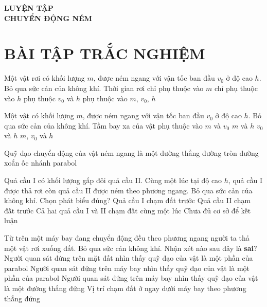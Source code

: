 \begin{center}\textbf{\color{red}LUYỆN TẬP}\\
	\textbf{CHUYỂN ĐỘNG NÉM}
\end{center}
\section{BÀI TẬP TRẮC NGHIỆM}
\begin{ex}
Một vật rơi có khối lượng $m$, được ném ngang với vận tốc ban đầu $v_0$ ở độ cao $h$. Bỏ qua sức cản của không khí. Thời gian rơi	
	\choice
	{chỉ phụ thuộc vào $m$}
	{\True chỉ phụ thuộc vào $h$}
	{phụ thuộc $v_0$ và $h$}
	{phụ thuộc vào $m$, $v_0$, $h$}
	\loigiai{}
\end{ex}
\begin{ex}
	Một vật có khối lượng $m$, được ném ngang với vận tốc ban đầu $v_0$ ở độ cao $h$. Bỏ qua sức cản của không khí. Tầm bay xa của vật phụ thuộc vào
	\choice
	{$m$ và $v_0$}
	{$m$ và $h$}
	{$v_0$ và $h$}
	{$m$, $v_0$ và $h$}
	\loigiai{}
\end{ex}
\begin{ex}
	Quỹ đạo chuyển động của vật ném ngang là một 
	\choice
	{đường thẳng}
	{đường tròn}
	{đường xoắn ốc}
	{nhánh parabol}
	\loigiai{}
\end{ex}
\begin{ex}
	Quả cầu I có khối lượng  gấp đôi quả cầu II. Cùng một lúc tại độ cao $h$, quả cầu I được thả rơi còn quả cầu II được ném theo phương ngang. Bỏ qua sức cản của không khí. Chọn phát biểu đúng?
	\choice
	{Quả cầu I chạm đất trước}
	{Quả cầu II chạm đất trước}
	{Cả hai quả cầu I và II chạm đất cùng một lúc}
	{Chưa đủ cơ sở để kết luận}
	\loigiai{}
\end{ex}
\begin{ex}
Từ trên một máy bay đang chuyển động đều theo phương ngang người ta thả một vật rơi xuống đất. Bỏ qua sức cản không khí. Nhận xét nào sau đây là \textbf{sai}?	
	\choice
	{Người quan sát đứng trên mặt đất nhìn thấy quỹ đạo của vật là một phần của parabol}
	{Người quan sát đứng trên máy bay nhìn thấy quỹ đạo của vật là một phần của parabol}
	{Người quan sát đứng trên máy bay nhìn thấy quỹ đạo của vật là một đường thẳng đứng}
	{Vị trí chạm đất ở ngay dưới máy bay theo phương thẳng đứng}
	\loigiai{}
\end{ex}
